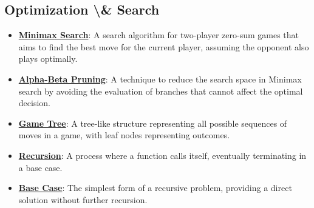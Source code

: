 \documentclass{article}%
\begin{document}
\subsection{Optimization \textbackslash{}\& Search}%
\label{subsec:OptimizationSearch}%
\begin{itemize}[leftmargin=*]%
\item \href{https://purdue.brightspace.com/d2l/common/assets/pdfjs-d2l-dist/1.0.14-legacy/web/viewer.html?file=%2Fcontent%2Fenforced%2F1095467-wl.202510.CS.24300.001%2F02L2-Intro.pdf%3Fou%3D1095467&lang=en-us&container=d2l-fileviewer-rendered-pdf&fullscreen=d2l-fileviewer-rendered-pdf-dialog&height=667#page=22}{\textbf{Minimax Search}}: A search algorithm for two-player zero-sum games that aims to find the best move for the current player, assuming the opponent also plays optimally.%
\item \href{https://purdue.brightspace.com/d2l/common/assets/pdfjs-d2l-dist/1.0.14-legacy/web/viewer.html?file=%2Fcontent%2Fenforced%2F1095467-wl.202510.CS.24300.001%2F02L2-Intro.pdf%3Fou%3D1095467&lang=en-us&container=d2l-fileviewer-rendered-pdf&fullscreen=d2l-fileviewer-rendered-pdf-dialog&height=667#page=23}{\textbf{Alpha-Beta Pruning}}: A technique to reduce the search space in Minimax search by avoiding the evaluation of branches that cannot affect the optimal decision.%
\item \href{https://purdue.brightspace.com/d2l/common/assets/pdfjs-d2l-dist/1.0.14-legacy/web/viewer.html?file=%2Fcontent%2Fenforced%2F1095467-wl.202510.CS.24300.001%2F02L2-Intro.pdf%3Fou%3D1095467&lang=en-us&container=d2l-fileviewer-rendered-pdf&fullscreen=d2l-fileviewer-rendered-pdf-dialog&height=667#page=11}{\textbf{Game Tree}}: A tree-like structure representing all possible sequences of moves in a game, with leaf nodes representing outcomes.%
\item \href{https://purdue.brightspace.com/d2l/common/assets/pdfjs-d2l-dist/1.0.14-legacy/web/viewer.html?file=%2Fcontent%2Fenforced%2F1095467-wl.202510.CS.24300.001%2F14L1-DepthFS.pdf%3Fou%3D1095467&lang=en-us&container=d2l-fileviewer-rendered-pdf&fullscreen=d2l-fileviewer-rendered-pdf-dialog&height=667#page=2}{\textbf{Recursion}}: A process where a function calls itself, eventually terminating in a base case.%
\item \href{https://purdue.brightspace.com/d2l/common/assets/pdfjs-d2l-dist/1.0.14-legacy/web/viewer.html?file=%2Fcontent%2Fenforced%2F1095467-wl.202510.CS.24300.001%2F14L1-DepthFS.pdf%3Fou%3D1095467&lang=en-us&container=d2l-fileviewer-rendered-pdf&fullscreen=d2l-fileviewer-rendered-pdf-dialog&height=667#page=5}{\textbf{Base Case}}: The simplest form of a recursive problem, providing a direct solution without further recursion.%

\end{itemize}
\end{document}

